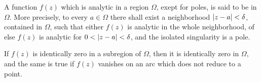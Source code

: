 \begin{definition}[Meromorphic]
    A function $f(z)$ which is analytic in a region $\Omega$, exept for poles,
    is said to be  in $\Omega$.
    More precisely, to every $a \in \Omega$ there shall exist a neighborhood
    $\left\vert z-a \right\vert < \delta$, contained in $\Omega$, such that either $f(z)$ is
    analytic in the whole neighborhood, of else $f(z)$ is analytic for
    $0<\left\vert z-a \right\vert<\delta$, and the isolated singularity is a pole.
\end{definition}

\begin{theorem}
    If $f(z)$ is identically zero in a subregion of $\Omega$, then it is identically
    zero in $\Omega$, and the same is true if $f(z)$ vanishes on an arc which does
    not reduce to a point.
\end{theorem}

